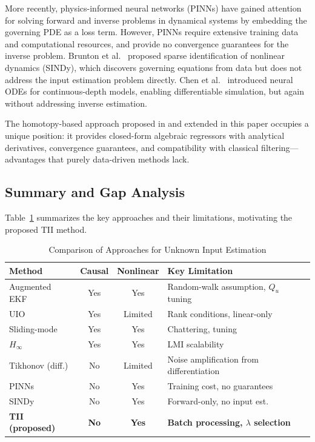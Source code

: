 \documentclass[lettersize,journal]{IEEEtran}
\begin{document}
More recently, physics-informed neural networks (PINNs) \cite{raissi2019} have gained attention for solving forward and inverse problems in dynamical systems by embedding the governing PDE as a loss term. However, PINNs require extensive training data and computational resources, and provide no convergence guarantees for the inverse problem. Brunton et al.\ \cite{brunton2016} proposed sparse identification of nonlinear dynamics (SINDy), which discovers governing equations from data but does not address the input estimation problem directly. Chen et al.\ \cite{chen2018} introduced neural ODEs for continuous-depth models, enabling differentiable simulation, but again without addressing inverse estimation.

The homotopy-based approach proposed in \cite{rodrigo2021rpic} and extended in this paper occupies a unique position: it provides closed-form algebraic regressors with analytical derivatives, convergence guarantees, and compatibility with classical filtering---advantages that purely data-driven methods lack.

\subsection{Summary and Gap Analysis}

Table~\ref{tab:related} summarizes the key approaches and their limitations, motivating the proposed TII method.

\begin{table}[!t]
\centering
\caption{Comparison of Approaches for Unknown Input Estimation}
\label{tab:related}
\begin{tabular}{p{2.7cm}ccp{2.8cm}}
\toprule
Method & Causal & Nonlinear & Key Limitation \\
\midrule
Augmented EKF \cite{gillijns2007} & Yes & Yes & Random-walk assumption, $Q_u$ tuning \\
UIO \cite{hou1998} & Yes & Limited & Rank conditions, linear-only \\
Sliding-mode \cite{floquet2007} & Yes & Yes & Chattering, tuning \\
$H_\infty$ \cite{shi2016} & Yes & Yes & LMI scalability \\
Tikhonov (diff.) \cite{orjuela2019} & No & Limited & Noise amplification from differentiation \\
PINNs \cite{raissi2019} & No & Yes & Training cost, no guarantees \\
SINDy \cite{brunton2016} & No & Yes & Forward-only, no input est. \\
\midrule
\textbf{TII (proposed)} & \textbf{No} & \textbf{Yes} & \textbf{Batch processing, $\lambda$ selection} \\
\bottomrule
\end{tabular}
\end{table}
\end{document}
